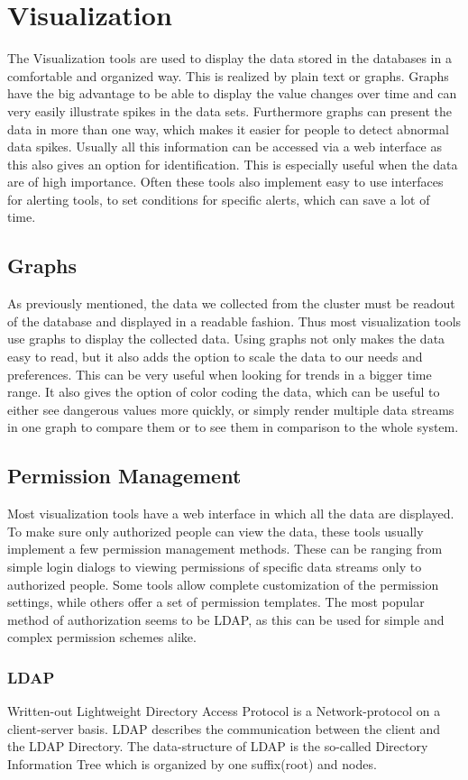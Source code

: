 \section{Visualization} 
The Visualization tools are used to display the data stored in the databases in a comfortable and organized way. This is realized by plain text or graphs. Graphs have the big advantage to be able to display the value changes over time and can very easily illustrate spikes in the data sets. Furthermore graphs can present the data in more than one way, which makes it easier for people to detect abnormal data spikes.
Usually all this information can be accessed via a web interface as this also gives an option for identification. This is especially useful when the data are of high importance.
Often these tools also implement easy to use interfaces for alerting tools, to set conditions for specific alerts, which can save a lot of time.

\subsection{Graphs}
As previously mentioned, the data we collected from the cluster must be readout of the database and displayed in a readable fashion. Thus most visualization tools use graphs to display the collected data. 
Using graphs not only makes the data easy to read, but it also adds the option to scale the data to our needs and preferences. This can be very useful when looking for trends in a bigger time range.
It also gives the option of color coding the data, which can be useful to either see dangerous values more quickly, or simply render multiple data streams in one graph to compare them or to see them in comparison to the whole system.
\subsection{Permission Management}
Most visualization tools have a web interface in which all the data are displayed. To make sure only authorized people can view the data, these tools usually implement a few permission management methods. 
These can be ranging from simple login dialogs to viewing permissions of specific data streams only to authorized people. Some tools allow complete customization of the permission settings, while others offer a set of permission templates. The most popular method of authorization seems to be LDAP, as this can be used for simple and complex permission schemes alike. 
\subsubsection{LDAP}
Written-out Lightweight Directory Access Protocol is a Network-protocol on a client-server basis. LDAP describes the communication between the client and the LDAP Directory. The data-structure of LDAP is the so-called Directory Information Tree which is organized by one suffix(root) and nodes.  

